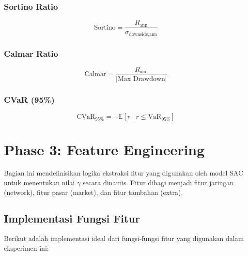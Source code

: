 \documentclass[12pt,a4paper]{article}
\begin{document}
\subsubsection{Sortino Ratio}
\begin{equation}
  \text{Sortino} = \frac{R_{\text{ann}}}{\sigma_{\text{downside,ann}}}
\end{equation}

\subsubsection{Calmar Ratio}
\begin{equation}
  \text{Calmar} = \frac{R_{\text{ann}}}{|\text{Max Drawdown}|}
\end{equation}

\subsubsection{CVaR (95\%)}
\begin{equation}
  \text{CVaR}_{95\%} = -\mathbb{E}[r \mid r \leq \text{VaR}_{95\%}]
\end{equation}

\section{Phase 3: Feature Engineering}

Bagian ini mendefinisikan logika ekstraksi fitur yang digunakan oleh model SAC untuk menentukan nilai $\gamma$ secara dinamis. Fitur dibagi menjadi fitur jaringan (network), fitur pasar (market), dan fitur tambahan (extra).

\subsection{Implementasi Fungsi Fitur}

Berikut adalah implementasi ideal dari fungsi-fungsi fitur yang digunakan dalam eksperimen ini:
\end{document}
